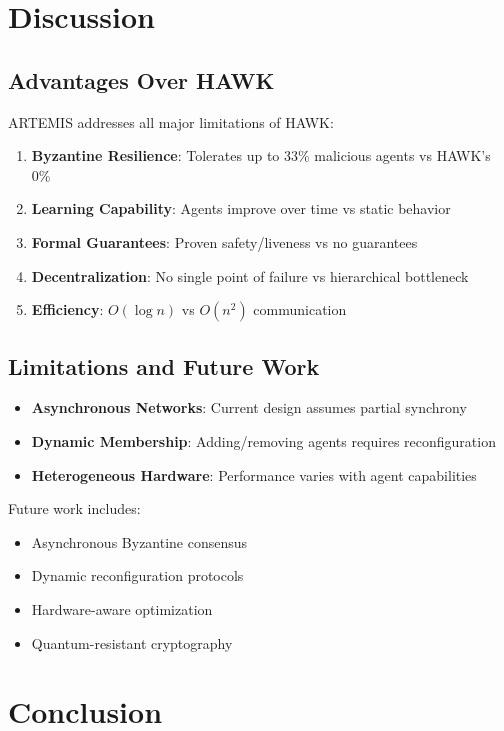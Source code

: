 \documentclass[conference]{IEEEtran}
\begin{document}
\section{Discussion}

\subsection{Advantages Over HAWK}

ARTEMIS addresses all major limitations of HAWK:

\begin{enumerate}
    \item \textbf{Byzantine Resilience}: Tolerates up to 33\% malicious agents vs HAWK's 0\%
    \item \textbf{Learning Capability}: Agents improve over time vs static behavior
    \item \textbf{Formal Guarantees}: Proven safety/liveness vs no guarantees
    \item \textbf{Decentralization}: No single point of failure vs hierarchical bottleneck
    \item \textbf{Efficiency}: $O(\log n)$ vs $O(n^2)$ communication
\end{enumerate}

\subsection{Limitations and Future Work}

\begin{itemize}
    \item \textbf{Asynchronous Networks}: Current design assumes partial synchrony
    \item \textbf{Dynamic Membership}: Adding/removing agents requires reconfiguration
    \item \textbf{Heterogeneous Hardware}: Performance varies with agent capabilities
\end{itemize}

Future work includes:
\begin{itemize}
    \item Asynchronous Byzantine consensus
    \item Dynamic reconfiguration protocols
    \item Hardware-aware optimization
    \item Quantum-resistant cryptography
\end{itemize}

\section{Conclusion}
\end{document}
